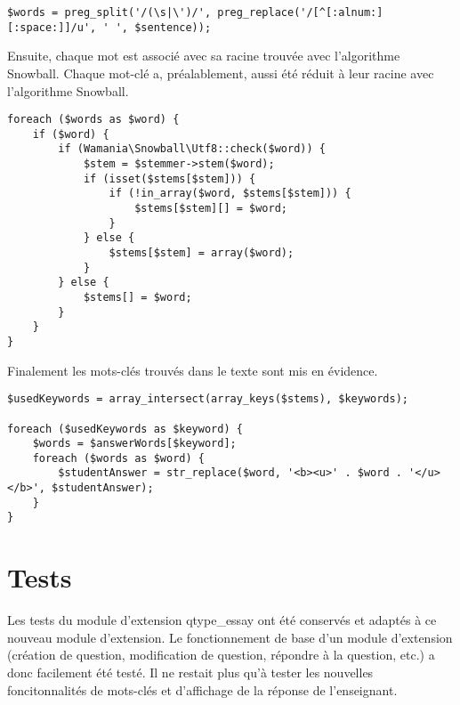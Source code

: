 \begin{lstfloat}
\begin{lstlisting}[frame=l]
$words = preg_split('/(\s|\')/', preg_replace('/[^[:alnum:][:space:]]/u', ' ', $sentence));
\end{lstlisting}
\caption{Isoler les mots du texte.}
\label{code:isoler}
\end{lstfloat}

Ensuite, chaque mot est associé avec sa racine trouvée avec l'algorithme Snowball.
Chaque mot-clé a, préalablement, aussi été réduit à leur racine avec l'algorithme Snowball.

\begin{lstfloat}
\begin{lstlisting}[frame=l]
foreach ($words as $word) {
	if ($word) {
		if (Wamania\Snowball\Utf8::check($word)) {
			$stem = $stemmer->stem($word);
			if (isset($stems[$stem])) {
				if (!in_array($word, $stems[$stem])) {
					$stems[$stem][] = $word;
				}
			} else {
				$stems[$stem] = array($word);
			}
		} else {
			$stems[] = $word;
		}
	}
}
\end{lstlisting}
\caption{Racination des mots avec Snowball.}
\label{code:racinationsnowball}
\end{lstfloat}

Finalement les mots-clés trouvés dans le texte sont mis en évidence.

\begin{lstfloat}
\begin{lstlisting}[frame=l]
$usedKeywords = array_intersect(array_keys($stems), $keywords);

foreach ($usedKeywords as $keyword) {
	$words = $answerWords[$keyword];
	foreach ($words as $word) {
		$studentAnswer = str_replace($word, '<b><u>' . $word . '</u></b>', $studentAnswer);
	}
}
\end{lstlisting}
\caption{Mise en évidence des mots-clés trouvés.}
\label{code:commentaire}
\end{lstfloat}

\section{Tests}

Les tests du module d'extension \og qtype\_essay \fg{} ont été conservés et adaptés à ce nouveau module d'extension.
Le fonctionnement de base d'un module d'extension (création de question, modification de question, répondre à la question, etc.) a donc facilement été testé.
Il ne restait plus qu'à tester les nouvelles foncitonnalités de mots-clés et d'affichage de la réponse de l'enseignant.

